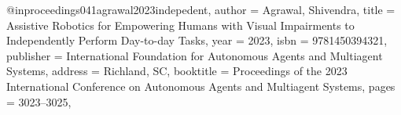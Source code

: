 @inproceedings{041agrawal2023indepedent,
author = {Agrawal, Shivendra},
title = {Assistive Robotics for Empowering Humans with Visual Impairments to Independently Perform Day-to-day Tasks},
year = {2023},
isbn = {9781450394321},
publisher = {International Foundation for Autonomous Agents and Multiagent Systems},
address = {Richland, SC},
booktitle = {Proceedings of the 2023 International Conference on Autonomous Agents and Multiagent Systems},
pages = {3023–3025},
}